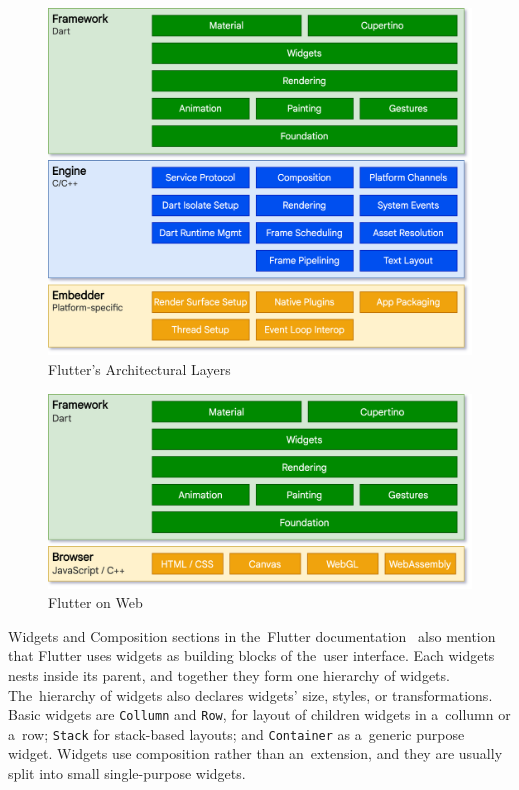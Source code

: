 \begin{figure}
    \centering
    \includegraphics[width=1\linewidth]{assets/design/flutterlayers.png}
    \caption{Flutter's Architectural Layers~\cite{a2022_flutter_architecture}}
    \label{fig:design:flutterlayers}
\end{figure}

\begin{figure}
    \centering
    \includegraphics[width=1\linewidth]{assets/design/flutterweb.png}
    \caption{Flutter on Web~\cite{a2022_flutter_architecture}}
    \label{fig:design:flutterweb}
\end{figure}

\pagebreak

Widgets and Composition sections in the~Flutter documentation~\cite{a2022_flutter_architecture} also mention that Flutter uses widgets as building blocks of the~user interface.
Each widgets nests inside its parent, and together they form one hierarchy of widgets.
The~hierarchy of widgets also declares widgets' size, styles, or transformations.
Basic widgets are \texttt{Collumn} and \texttt{Row}, for layout of children widgets in a~collumn or a~row; \texttt{Stack} for stack-based layouts; and \texttt{Container} as a~generic purpose widget.
Widgets use composition rather than an~extension, and they are usually split into small single-purpose widgets.

